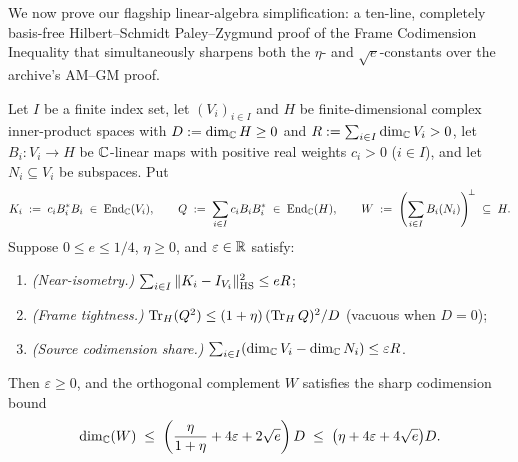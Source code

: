 We now prove our flagship linear-algebra simplification: a ten-line, completely basis-free Hilbert--Schmidt Paley--Zygmund proof of the Frame Codimension Inequality that simultaneously sharpens both the $\eta$- and $\sqrt{e}$-constants over the archive's AM--GM proof.


\begin{theorem}
\label{thm:05:frame-codim}
Let $I$ be a finite index set, let $(V_i)_{i \in I}$ and $H$ be finite-dimensional complex inner-product spaces with $D := \dim_{\mathbb{C}} H \ge 0$ and $R := \sum_{i \in I} \dim_{\mathbb{C}} V_i > 0$, let $B_i : V_i \to H$ be $\mathbb{C}$-linear maps with positive real weights $c_i > 0$ ($i \in I$), and let $N_i \subseteq V_i$ be subspaces. Put
\[
  K_i \;:=\; c_i B_i^* B_i \;\in\; \mathrm{End}_{\mathbb{C}}(V_i), \qquad
  Q \;:=\; \sum_{i \in I} c_i B_i B_i^* \;\in\; \mathrm{End}_{\mathbb{C}}(H), \qquad
  W \;:=\; \left(\sum_{i \in I} B_i(N_i)\right)^{\!\perp} \;\subseteq\; H.
\]
Suppose $0 \le e \le 1/4$, $\eta \ge 0$, and $\varepsilon \in \mathbb{R}$ satisfy:
\begin{enumerate}[label=\textup{(F\arabic*)}]
\item \emph{(Near-isometry.)} $\sum_{i \in I} \|K_i - I_{V_i}\|_{\mathrm{HS}}^2 \le e R$;
\item \emph{(Frame tightness.)} $\operatorname{Tr}_H(Q^2) \le (1 + \eta)\,(\operatorname{Tr}_H Q)^2 / D$ (vacuous when $D = 0$);
\item \emph{(Source codimension share.)} $\sum_{i \in I} (\dim_{\mathbb{C}} V_i - \dim_{\mathbb{C}} N_i) \le \varepsilon R$.
\end{enumerate}
Then $\varepsilon \ge 0$, and the orthogonal complement $W$ satisfies the sharp codimension bound
\begin{equation}
\label{eq:05:frame-codim}
  \dim_{\mathbb{C}}(W) \;\le\; \left(\frac{\eta}{1 + \eta} + 4\varepsilon + 2\sqrt{e}\right) D
  \;\le\; \bigl(\eta + 4\varepsilon + 4\sqrt{e}\bigr) D.
\end{equation}
\end{theorem}

